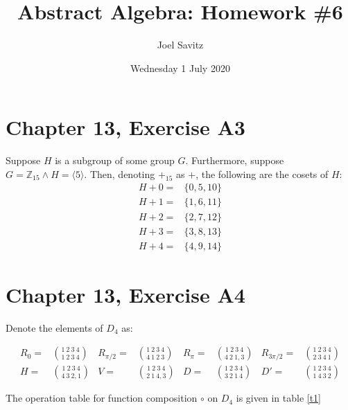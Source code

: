 \documentclass[12pt]{article}
\title{Abstract Algebra: Homework \#6}
\author{Joel Savitz}
\date{Wednesday 1 July 2020}
\newcommand{\ints}{\mathbb{Z}}
\begin{document}
\maketitle

\section{Chapter 13, Exercise A3}

Suppose $H$ is a subgroup of some group $G$.
Furthermore, suppose
$G = \ints_{15} \land H = \langle 5 \rangle$.
Then,
denoting $+_{15}$ as $+$,
the following are the cosets of $H$:
\begin{align*}
	H + 0 = & \{0, 5, 10 \} \\
	H + 1 = & \{1, 6, 11 \} \\
	H + 2 = & \{2, 7, 12 \} \\
	H + 3 = & \{3, 8, 13 \} \\
	H + 4 = & \{4, 9, 14 \}
\end{align*}

\section{Chapter 13, Exercise A4}

Denote the elements of $D_4$ as:

\begin{align}
	\label{topperm}
	R_0 = & \binom{1\ 2\ 3\ 4}{1\ 2\ 3\ 4} &
	R_{\pi/2} = & \binom{1\ 2\ 3\ 4}{4\ 1\ 2\ 3} &
	R_{\pi} = & \binom{1\ 2\ 3\ 4}{4\ 2\ 1, 3} &
	R_{3\pi/2} = & \binom{1\ 2\ 3\ 4}{2\ 3\ 4\ 1} \\
	\label{botperm}
	H  = & \binom{1\ 2\ 3\ 4}{4\ 3\ 2, 1} &
	V  = & \binom{1\ 2\ 3\ 4}{2\ 1\ 4, 3} &
	D = & \binom{1\ 2\ 3\ 4}{3\ 2\ 1\ 4} &
	D' = & \binom{1\ 2\ 3\ 4}{1\ 4\ 3\ 2}
\end{align}

The operation table for
function composition $\circ$
on $D_4$
is given in table \ref{t1}
\end{document}
